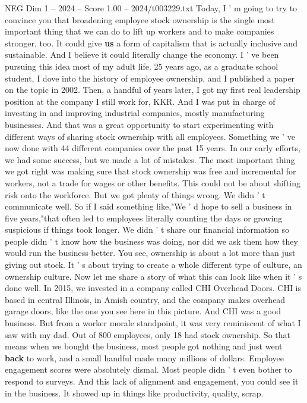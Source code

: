 \begin{textsample}{NEG Dim 1 – 2024 – Score 1.00 – 2024/t003229.txt}
Today, I ' m going to try to convince you that broadening employee stock ownership is the single most important thing that we can do to lift up workers and to make companies stronger, too.
It could give \textbf{us} a form of capitalism that is actually inclusive and sustainable.
And I believe it could literally change the economy.
I ' ve been pursuing this idea most of my adult life. 25 years ago, as a graduate school student, I dove into the history of employee ownership, and I published a paper on the topic in 2002.
Then, a handful of years later, I got my first real leadership position at the company I still work for, KKR.
And I was put in charge of investing in and improving industrial companies, mostly manufacturing businesses.
And that was a great opportunity to start experimenting with different ways of sharing stock ownership with all employees.
Something we ' ve now done with 44 different companies over the past 15 years.
In our early efforts, we had some success, but we made a lot of mistakes.
The most important thing we got right was making sure that stock ownership was free and incremental for workers, not a trade for wages or other benefits.
This could not be about shifting risk onto the workforce.
But we got plenty of things wrong.
We didn ' t communicate well.
So if I said something like,"We ' d hope to sell a business in five years,"that often led to employees literally counting the days or growing suspicious if things took longer.
We didn ' t share our financial information so people didn ' t know how the business was doing, nor did we ask them how they would run the business better.
You see, ownership is about a lot more than just giving out stock.
It ' s about trying to create a whole different type of culture, an ownership culture.
Now let me share a story of what this can look like when it ' s done well.
In 2015, we invested in a company called CHI Overhead Doors.
CHI is based in central Illinois, in Amish country, and the company makes overhead garage doors, like the one you see here in this picture.
And CHI was a good business.
But from a worker morale standpoint, it was very reminiscent of what I saw with my dad.
Out of 800 employees, only 18 had stock ownership.
So that means when we bought the business, most people got nothing and just went \textbf{back} to work, and a small handful made many millions of dollars.
Employee engagement scores were absolutely dismal.
Most people didn ' t even bother to respond to surveys.
And this lack of alignment and engagement, you could see it in the business.
It showed up in things like productivity, quality, scrap.

\end{textsample}
